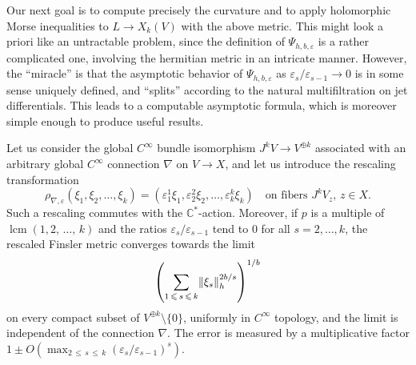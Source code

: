\documentclass[AHL,Unicode,longabstracts,published]{cedram}
\DeclareMathOperator{\lcm}{lcm}
\DeclarePairedDelimiter{\Abs}{\lVert}{\rVert}
\newcommand*\bC{\mathbb{C}}
\let\leq\leqslant
\begin{document}
Our next goal is to compute precisely the curvature and to apply holomorphic Morse inequalities to $L\to X_k(V)$ with the above metric. This might look a priori like an untractable problem, since the definition of $\Psi_{h,b,\varepsilon}$ is a rather complicated one, involving the hermitian metric in an intricate manner. However, the ``miracle'' is that the asymptotic behavior of $\Psi_{h,b,\varepsilon}$ as $\varepsilon_s/\varepsilon_{s-1}\to 0$ is in some sense uniquely defined, and ``splits'' according to the natural multifiltration on jet differentials. This leads to a computable asymptotic formula, which is moreover simple enough to produce useful results.

\begin{lemm}\label{lemm:rescaling}
Let us consider the global $C^\infty$ bundle isomorphism
$J^kV\to V^{\oplus k}$ associated with an arbitrary global $C^\infty$ connection
$\nabla$ on $V\to X$, and let us introduce the rescaling transformation
\[
\rho_{\nabla,\varepsilon}(\xi_1,\xi_2,\dotsc,\xi_k)= \left(\varepsilon_1^1\xi_1,\varepsilon_2^2\xi_2,\dotsc,
\varepsilon_k^k\xi_k\right)\quad
\text{on fibers $J^kV_z$, $z\in X$}.
\]
Such a rescaling commutes with the $\bC^*$-action. Moreover, if $p$ is a multiple of $\lcm(1,2,\,\dotsc,\,k)$ and the ratios
$\varepsilon_s/\varepsilon_{s-1}$ tend to $0$ for all $s=2,\dotsc,k$, the rescaled Finsler metric
 converges towards the limit
\[
\left(\sum_{1\,\leq\,s\,\leq\,k}
\Abs{\xi_s}^{2b/s}_h\right)^{1/b}
\]
on every compact subset of $V^{\oplus k}\setminus\{0\}$, uniformly in $C^\infty$ topology, and the limit is independent of the connection $\nabla$. The error is measured by a multiplicative factor
$1\pm O(\max_{2\,\leq\,s\,\leq\,k}(\varepsilon_s/\varepsilon_{s-1})^s)$.
\end{lemm}
\end{document}
